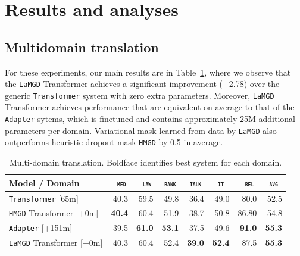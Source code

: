 \documentclass[11pt]{article}
\newcommand{\revision}[1]{\textcolor{black}{#1}}
\newcommand{\domain}[1]{\texttt{\textsc{#1}}}
\newcommand{\system}[1]{\texttt{{#1}}}
\newcommand{\SB}[1]{\textbf{#1}}
\begin{document}
\section{Results and analyses}

\subsection{Multidomain translation}
For these experiments, our main results are in Table~\ref{tab:mdmt}, where we observe that the \system{LaMGD} Transformer achieves a significant improvement (+2.78) over the generic \system{Transformer} system with zero extra parameters. Moreover, \system{LaMGD} Transformer achieves performance that are equivalent on average to that of the \system{Adapter} sytems, which is finetuned and contains approximately 25M additional parameters per domain. Variational mask learned from data by \system{LaMGD} also outperforms heuristic dropout mask \system{HMGD} by 0.5 in average.
\begin{table}[h!]
  \centering
  \begin{tabular}{|p{4cm}|*{7}{r|}} \hline
    Model / Domain & \multicolumn{1}{c|}{\domain{ med}} & \multicolumn{1}{c|}{\domain{ law}} & \multicolumn{1}{c|}{\domain{bank}} & \multicolumn{1}{c|}{\domain{talk}} & \multicolumn{1}{c|}{\domain{ it }} & \multicolumn{1}{c|}{\domain{ rel}} & \multicolumn{1}{c|}{\domain{avg}} \\ \hline 
    \system{Transformer}  \hfill{\footnotesize[65m]} & 40.3 & 59.5 & 49.8 & 36.4 & 49.0 & 80.0  & 52.5\\
    \system{HMGD} Transformer   \hfill{\footnotesize[+0m]}  & \SB{40.4} & 60.4 & 51.9 & 38.7 &	50.8 &	86.80 & 54.8 \\ 
    \revision{\system{Adapter}}   \hfill{\footnotesize[+151m]}  & 39.5 & \SB{61.0} & \SB{53.1} & 37.5 & 49.6 & \SB{91.0} & \SB{55.3} \\ 
    \system{LaMGD} Transformer   \hfill{\footnotesize[+0m]}  & 40.3 & 60.4 & 52.4 & \SB{39.0} & \SB{52.4} & 87.5 & \SB{55.3} \\ 
    \hline
  \end{tabular}
  \caption{Multi-domain translation. Boldface identifies best system for each domain.}
  \label{tab:mdmt}
\end{table}
\end{document}
